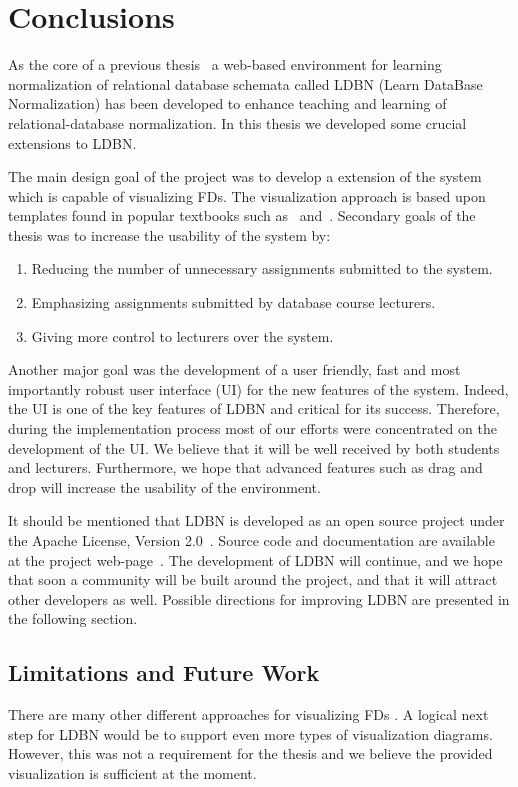 \chapter{Conclusions}
\label{chap:conclusion}
As the core of a previous thesis~\cite{mt1}
a web-based environment for learning normalization of relational database schemata
called LDBN (Learn DataBase Normalization) has been developed to
enhance teaching and learning of relational-database normalization. 
In this thesis we developed some
crucial extensions to LDBN.

The main design goal of the project was to develop a extension of the system which is capable of 
visualizing FDs. The visualization approach is based
upon templates found in popular textbooks such as~\cite{bdb1} and~\cite{bdb2}. Secondary goals of the
thesis was to increase the usability of the system by: 

\begin{enumerate}
	\item Reducing the number of unnecessary assignments
	submitted to the system.
	\item Emphasizing assignments submitted by database course lecturers.
	\item Giving more control to lecturers over the system.
\end{enumerate}

Another major goal was the
development of a user friendly, fast and most importantly robust
user interface (UI) for the new features of the system. 
Indeed, the UI is one of the key features of LDBN and critical for its
success. Therefore, during the implementation process 
most of our efforts were concentrated on the development of the UI. We believe that it will be well received 
by both students and lecturers.
Furthermore, we hope that advanced features such as drag and drop will 
increase the usability of the environment.

It should be mentioned that LDBN is developed as an open source project 
under the Apache License, Version 2.0~\cite{walv2}. 
Source code and documentation are available at the project web-page~\cite{wldbnp}. 
The development of LDBN will continue, and we
hope that soon a community will be
built around the project, and that it will attract other developers as well. Possible directions for 
improving LDBN are presented in the following section. 

\section{Limitations and Future Work}
There are many other different approaches for visualizing FDs .
A logical next step for LDBN would be to support
even more types of visualization diagrams. 
However, this was not a requirement for the thesis and we believe the provided 
visualization is sufficient at the moment. 

